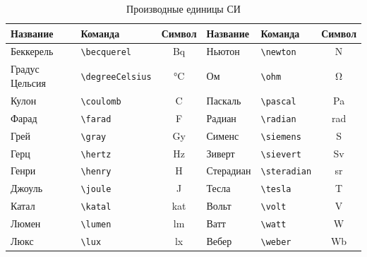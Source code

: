 \begin{table}
    \small
    \centering
    \begin{threeparttable}%
        \caption{Производные единицы СИ}\label{tab:unit:derived}
        \begin{tabular}{llc|llc}
            \toprule
            Название       & Команда               & Символ              & Название & Команда & Символ \\
            \midrule
            Беккерель      & \verb|\becquerel|     & \si{\becquerel}     &
            Ньютон         & \verb|\newton|        & \si{\newton}                                      \\
            Градус Цельсия & \verb|\degreeCelsius| & \si{\degreeCelsius} &
            Ом             & \verb|\ohm|           & \si{\ohm}                                         \\
            Кулон          & \verb|\coulomb|       & \si{\coulomb}       &
            Паскаль        & \verb|\pascal|        & \si{\pascal}                                      \\
            Фарад          & \verb|\farad|         & \si{\farad}         &
            Радиан         & \verb|\radian|        & \si{\radian}                                      \\
            Грей           & \verb|\gray|          & \si{\gray}          &
            Сименс         & \verb|\siemens|       & \si{\siemens}                                     \\
            Герц           & \verb|\hertz|         & \si{\hertz}         &
            Зиверт         & \verb|\sievert|       & \si{\sievert}                                     \\
            Генри          & \verb|\henry|         & \si{\henry}         &
            Стерадиан      & \verb|\steradian|     & \si{\steradian}                                   \\
            Джоуль         & \verb|\joule|         & \si{\joule}         &
            Тесла          & \verb|\tesla|         & \si{\tesla}                                       \\
            Катал          & \verb|\katal|         & \si{\katal}         &
            Вольт          & \verb|\volt|          & \si{\volt}                                        \\
            Люмен          & \verb|\lumen|         & \si{\lumen}         &
            Ватт           & \verb|\watt|          & \si{\watt}                                        \\
            Люкс           & \verb|\lux|           & \si{\lux}           &
            Вебер          & \verb|\weber|         & \si{\weber}                                       \\
            \bottomrule
        \end{tabular}
    \end{threeparttable}
\end{table}

